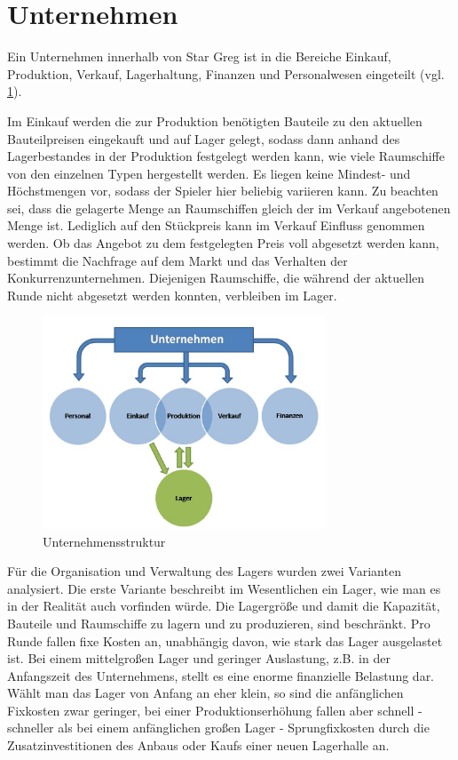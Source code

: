 \section{Unternehmen}
\label{sec:spielwelt-unternehmen}


Ein Unternehmen innerhalb von Star Greg ist in die Bereiche Einkauf, Produktion, Verkauf, Lagerhaltung, Finanzen und Personalwesen eingeteilt (vgl. \ref{fig:spielwelt-unternehmen}). 

Im Einkauf werden die zur Produktion benötigten Bauteile zu den aktuellen Bauteilpreisen eingekauft und auf Lager gelegt, sodass dann anhand des Lagerbestandes in der Produktion festgelegt werden kann, wie viele Raumschiffe von den einzelnen Typen hergestellt werden. Es liegen keine Mindest- und Höchstmengen vor, sodass der Spieler hier beliebig variieren kann. Zu beachten sei, dass die gelagerte Menge an Raumschiffen gleich der im Verkauf angebotenen Menge ist. Lediglich auf den Stückpreis kann im Verkauf Einfluss genommen werden. Ob das Angebot zu dem festgelegten Preis voll abgesetzt werden kann, bestimmt die Nachfrage auf dem Markt und das Verhalten der Konkurrenzunternehmen. Diejenigen Raumschiffe, die während der aktuellen Runde nicht abgesetzt werden konnten, verbleiben im Lager. 

\begin{figure}[htb]
\centering
\includegraphics[width=0.75\textwidth]{20_Spielwelt/20_Unternehmen/Unternehmensstruktur.jpg}
\caption{Unternehmensstruktur}\label{fig:spielwelt-unternehmen}
\end{figure}

Für die Organisation und Verwaltung des Lagers wurden zwei Varianten analysiert. Die erste Variante beschreibt im Wesentlichen  ein Lager, wie man es in der Realität auch vorfinden würde. Die Lagergröße und damit die Kapazität, Bauteile und Raumschiffe zu lagern und zu produzieren, sind beschränkt. Pro Runde fallen fixe Kosten an, unabhängig davon, wie stark das Lager ausgelastet ist. Bei einem mittelgroßen Lager und geringer Auslastung, z.B. in der Anfangszeit des Unternehmens, stellt es eine enorme finanzielle Belastung dar. Wählt man das Lager von Anfang an eher klein, so sind die anfänglichen Fixkosten zwar geringer, bei einer Produktionserhöhung fallen aber schnell - schneller als bei einem anfänglichen großen Lager - Sprungfixkosten durch die Zusatzinvestitionen des Anbaus oder Kaufs einer neuen Lagerhalle an. 


